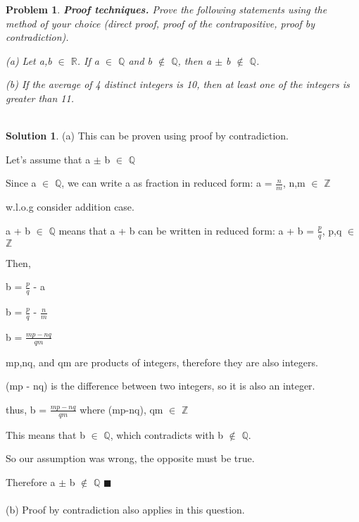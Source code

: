 \documentclass{article}
\newtheorem{problem}{Problem}
\theoremstyle{definition}
\newtheorem*{solution}{Solution}
\begin{document}
\begin{problem}

\textbf{Proof techniques.} Prove the following statements using the method of your choice (direct proof, proof of the contrapositive, proof by contradiction).

(a) Let a,b \(\in\) \(\mathbb{R}\). If a \(\in\) \(\mathbb{Q}\) and b \(\notin\) \(\mathbb{Q}\), then a \(\pm\) b \(\notin\) \(\mathbb{Q}\).

(b) If the average of 4 distinct integers is 10, then at least one of the integers is greater than 11.\\\\

\end{problem}

\begin{solution}

(a) This can be proven using proof by contradiction.

Let's assume that  a \(\pm\) b \(\in\) \(\mathbb{Q}\)

Since a \(\in\) \(\mathbb{Q}\), we can write a as fraction in reduced form: a = \(\frac{n}{m}\), n,m \(\in\) \(\mathbb{Z}\)

w.l.o.g consider addition case.

a + b \(\in\) \(\mathbb{Q}\) means that a + b can be written in reduced form: a + b =  \(\frac{p}{q}\), p,q \(\in\) \(\mathbb{Z}\)

Then, 

b =  \(\frac{p}{q}\) - a

b = \(\frac{p}{q}\) - \(\frac{n}{m}\)

b = \(\frac{mp - nq}{qm}\) 

mp,nq, and qm are products of integers, therefore they are also integers. 

(mp - nq) is the difference between two integers, so it is also an integer.

thus, b = \(\frac{mp - nq}{qm}\) where (mp-nq), qm \(\in\) \(\mathbb{Z}\)

This means that b \(\in\) \(\mathbb{Q}\), which contradicts with b \(\notin\) \(\mathbb{Q}\).

So our assumption was wrong, the opposite must be true. 

Therefore a \(\pm\) b \(\notin\) \(\mathbb{Q}\)                \(\blacksquare\)\\\\



(b) Proof by contradiction also applies in this question.


\end{solution}
\end{document}
